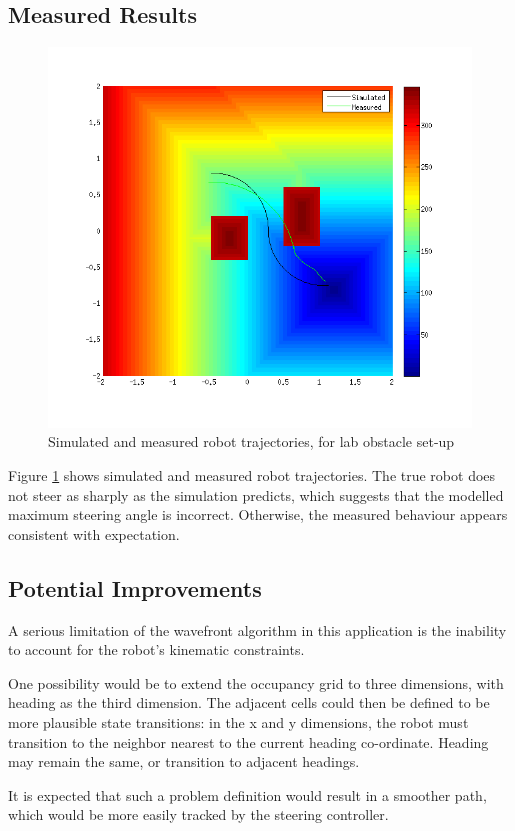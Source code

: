 \documentclass[11pt]{article} %
\begin{document}
\clearpage
\subsection{Measured Results}

\begin{figure} [hbt]
 \centering
 \includegraphics[scale=0.75]{wavefront_meas.png}
 \caption{Simulated and measured robot trajectories, for lab obstacle set-up}
 \label{wave_meas}
\end{figure}

Figure \ref{wave_meas} shows simulated and measured robot trajectories.  The true robot does not steer as sharply as the simulation predicts, which suggests that the modelled maximum steering angle is incorrect.  Otherwise, the measured behaviour appears consistent with expectation.

\subsection{Potential Improvements}
A serious limitation of the wavefront algorithm in this application is the inability to account for the robot's kinematic constraints.  

One possibility would be to extend the occupancy grid to three dimensions, with heading as the third dimension.  The adjacent cells could then be defined to be more plausible state transitions:  in the x and y dimensions, the robot must transition to the neighbor nearest to the current heading co-ordinate.  Heading may remain the same, or transition to adjacent headings.

It is expected that such a problem definition would result in a smoother path, which would be more easily tracked by the steering controller.
\end{document}
